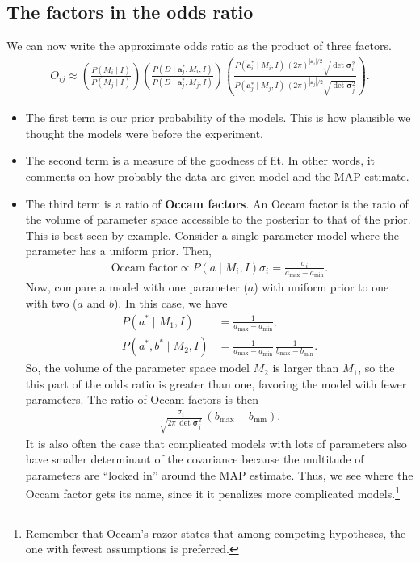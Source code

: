 \subsection{The factors in the odds ratio}
We can now write the approximate odds ratio as the product of three
factors.
\begin{align}
O_{ij} \approx \left(\frac{P(M_i\mid I)}{P(M_j\mid I)}\right)
\left(\frac{P(D\mid \mathbf{a}_j^*, M_i, I)}{P(D\mid \mathbf{a}_j^*, M_j, I)}\right)
\left(\frac{P(\mathbf{a}_i^*\mid M_i, I)\,\left(2\pi\right)^{|\mathbf{a}_i|/2}\sqrt{\det\boldsymbol{\sigma}_i^2}}
{P(\mathbf{a}_j^*\mid M_j, I)\,\left(2\pi\right)^{|\mathbf{a}_j|/2}\sqrt{\det\boldsymbol{\sigma}_j^2}}\right).
\end{align}
\begin{itemize}
\item The first term is our prior probability of the models.  This is
  how plausible we thought the models were before the experiment.
\item The second term is a measure of the goodness of fit.  In other
  words, it comments on how probably the data are given model and the
  MAP estimate.
\item The third term is a ratio of \textbf{Occam factors}.  An Occam
  factor is the ratio of the volume of parameter space accessible to
  the posterior to that of the prior.  This is best seen by example.
  Consider a single parameter model where the parameter has a uniform
  prior.  Then,
  \begin{align}
    \text{Occam factor} \propto P(a\mid M_i, I) \sigma_i = \frac{\sigma_i}{a_\mathrm{max} - a_\mathrm{min}}.
  \end{align}
  Now, compare a model with one parameter ($a$) with uniform prior to
  one with two ($a$ and $b$).  In this case, we have
  \begin{align}
    P(a^*\mid M_1,I) &= \frac{1}{a_\mathrm{max} - a_\mathrm{min}}, \\
    P(a^*, b^*\mid M_2,I) &= \frac{1}{a_\mathrm{max} - a_\mathrm{min}}\,
                            \frac{1}{b_\mathrm{max} - b_\mathrm{min}}.
  \end{align}
  So, the volume of the parameter space model $M_2$ is larger than
  $M_1$, so the this part of the odds ratio is greater than one,
  favoring the model with fewer parameters.  The ratio of Occam
  factors is then
  \begin{align}
    \frac{\sigma_i}{\sqrt{2\pi \,\det \boldsymbol{\sigma}_j^2}}\, (b_\mathrm{max} - b_\mathrm{min}).
  \end{align}
  It is also often the case that complicated models with lots of
  parameters also have smaller determinant of the covariance because
  the multitude of parameters are ``locked in'' around the MAP
  estimate.  Thus, we see where the Occam factor gets its name, since
  it it penalizes more complicated models.\footnote{Remember that
    Occam's razor states that among competing hypotheses, the one with
    fewest assumptions is preferred.}
\end{itemize}

